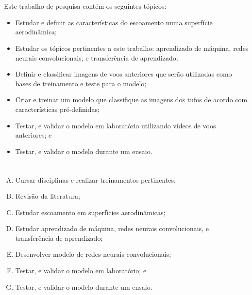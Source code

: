\documentclass[12pt, a4paper]{article}
\begin{document}
\section{\sectionIV}
\label{sec:res-scope}
Este trabalho de pesquisa contém os seguintes tópicos:

\begin{itemize}
    \item Estudar e definir as características do escoamento numa superfície aerodinâmica;
    \item Estudar os tópicos pertinentes a este trabalho: aprendizado de máquina, redes neurais convolucionais, e  transferência de aprendizado;
    \item Definir e classificar imagens de voos anteriores que serão utilizadas como bases de treinamento e teste para o modelo;
    \item Criar e treinar um modelo que classifique as imagens dos tufos de acordo com características pré-definidas;
    \item Testar, e validar o modelo em laboratório utilizando vídeos de voos anteriores; e
    \item Testar, e validar o modelo durante um ensaio.
\end{itemize}

\section{\sectionV}
\label{sec:schedule}

\begin{enumerate}[A.]
    \item Cursar disciplinas e realizar treinamentos pertinentes;
    \item Revisão da literatura;
    \item Estudar escoamento em superfícies aerodinâmicas;
    \item Estudar aprendizado de máquina, redes neurais convolucionais, e  transferência de aprendizado;
    \item Desenvolver modelo de redes neurais convolucionais;
    \item Testar, e validar o modelo em laboratório; e
    \item Testar, e validar o modelo durante um ensaio.
\end{enumerate}
\end{document}
